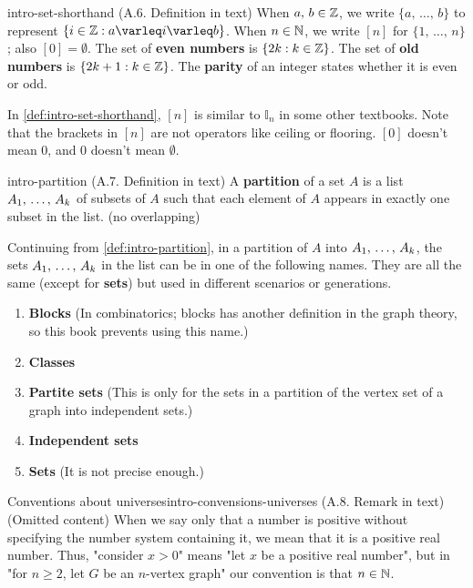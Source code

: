 \documentclass[../src/handouts/main.tex]{subfiles}
\begin{document}
\begin{definition}{}{intro-set-shorthand}
  (A.6. Definition in text)
  When $a,\, b \in \mathbb{Z}$, we write $\{a,\, \ldots,\, b\}$ to represent $\{ i \in \Z: a \leq i \leq b \}$.
  When $n \in \mathbb{N}$, we write $[n]$ for $\{1,\, \ldots,\, n\}$; also $[0] = \emptyset$.
  The set of \textbf{even numbers} is $\{ 2 k : k \in \mathbb{Z} \}$.
  The set of \textbf{old numbers} is $\{ 2 k + 1 : k \in \mathbb{Z} \}$.
  The \textbf{parity} of an integer states whether it is even or odd.
\end{definition}

In \cref{def:intro-set-shorthand}, $[n]$ is similar to $\mathbb{I}_n$ in some other textbooks. Note that the brackets in $[n]$ are not operators like ceiling or flooring. $[0]$ doesn't mean 0, and 0 doesn't mean $\emptyset$.

\begin{definition}{}{intro-partition}
  (A.7. Definition in text)
  A \textbf{partition} of a set $A$ is a list ${A}_1,\, \ldots,\, {A}_{k}$ of subsets of $A$ such that each element of $A$ appears in exactly one subset in the list. (no overlapping)
\end{definition}

Continuing from \cref{def:intro-partition}, in a partition of $A$ into ${A}_1,\, \ldots,\, {A}_{k}$, the sets ${A}_1,\, \ldots,\, {A}_{k}$ in the list can be in one of the following names. They are all the same (except for \textbf{sets}) but used in different scenarios or generations.
\begin{enumerate}
  \item \textbf{Blocks} (In combinatorics; blocks has another definition in the graph theory, so this book prevents using this name.)
  \item \textbf{Classes}
  \item \textbf{Partite sets} (This is only for the sets in a partition of the vertex set of a graph into independent sets.)
  \item \textbf{Independent sets}
  \item \textbf{Sets} (It is not precise enough.)
\end{enumerate}

\begin{remark}{Conventions about universes}{intro-convensions-universes}
  (A.8. Remark in text)
  (Omitted content)
  When we say only that a number is positive without specifying the number system containing it, we mean that it is a positive real number. Thus, "consider $x > 0$" means "let $x$ be a positive real number", but in "for $n \geq 2$, let $G$ be an $n$-vertex graph" our convention is that $n \in \mathbb{N}$.
\end{remark}
\end{document}
